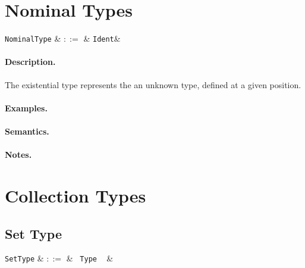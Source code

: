 
\section{Nominal Types}

\begin{syntax}
  \verb+NominalType+ & $::=$ & \verb+Ident+&\\
\end{syntax}

\paragraph{Description.} The existential type represents the an
unknown type, defined at a given position.

\paragraph{Examples.}

\paragraph{Semantics.}

\paragraph{Notes.}


\section{Collection Types}


\subsection{Set Type}

\begin{syntax}
  \verb+SetType+ & $::=$ & \token{\{} \ \verb+Type+ \ \token{\}} &\\
\end{syntax}


